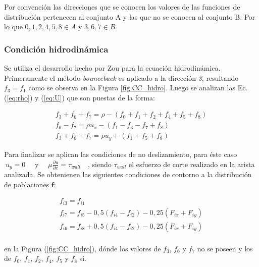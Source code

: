 Por convención las direcciones que se conocen los valores de las funciones de distribución pertenecen al conjunto A y las que no se conocen al conjunto B. Por lo que $ 0, 1, 2, 4, 5, 8 \in A$ y $ 3, 6, 7 \in B$ 


\subsubsection{Condición hidrodinámica}

Se utiliza el desarrollo hecho por Zou \cite{zou1997pressure} para la ecuación hidrodinámica. Primeramente el método \textit{bounceback} es aplicado a la dirección \textit{3}, resultando $f_{3} = f_{1}$ como se observa en la Figura \ref{fig:CC_hidro}. Luego se analizan las Ec. (\ref{eq:rho}) y (\ref{eq:U}) que son puestas de la forma:

\begin{equation}
	\begin{array}{c}
	f_{3} + f_{6} + f_{7} = \rho - \left( f_{0} + f_{1} + f_{2} + f_{4} + f_{5} + f_{8}	 \right)\\
	f_{6} - f_{7} = \rho u_{x} - \left( f_{1} - f_{3} - f_{7} + f_{8} 	 \right)\\
	f_{3} + f_{6} + f_{7} = \rho u_{y} + \left( f_{1} + f_{5} + f_{8} \right)
	\end{array}
\end{equation}

Para finalizar se aplican las condiciones de no deslizamiento, para éste caso $\> u_{y} = 0\quad$ y $\quad\mu \frac{\partial u}{\partial x} = \tau_{wall}\quad$, siendo $\tau_{wall}$ el esfuerzo de corte realizado en la arista analizada. Se obtenienen las siguientes condiciones de contorno a la distribución de poblaciones $\mathbf{f}$:

\begin{equation}
\begin{array}{c}
f_{i3} = f_{i1}\\
f_{i7} = f_{i5} - 0,5 (f_{i4} - f_{i2}) - 0,25 (F_{ix} + F_{iy})\\
f_{i6} = f_{i8} + 0,5 (f_{i4} - f_{i2}) - 0,25 (F_{ix} + F_{iy})\\
\end{array}
\end{equation}

\iffalse
en la Figura (\ref{fig:CC_hidro}), dónde los valores de $f_{3}$, $f_{6}$ y $f_{7}$ no se poseen y los de $f_{0}$, $f_{1}$, $f_{2}$, $f_{4}$, $f_{5}$ y $f_{8}$ si.


